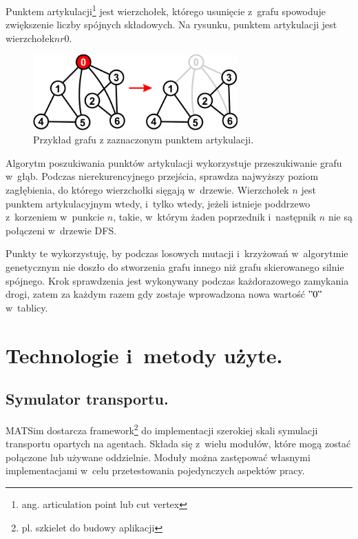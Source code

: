 \documentclass[twoside,12pt]{report}
\let\oldsection\chapter
\def\chapter{\cleardoublepage\oldsection}
\begin{document}
Punktem artykulacji\footnote{ang. articulation point lub cut vertex} jest wierzchołek, którego usunięcie z~grafu spowoduje zwiększenie liczby spójnych składowych. Na rysunku, punktem artykulacji jest wierzchołek$nr 0$.

\begin{figure}[h]
\begin{center}
\includegraphics[width=0.7\textwidth]{img/articulation}
\caption{Przykład grafu z zaznaczonym punktem artykulacji.}
\end{center}
\end{figure}

Algorytm poszukiwania punktów artykulacji wykorzystuje przeszukiwanie grafu w~głąb. Podczas nierekurencyjnego przejścia, sprawdza najwyższy poziom zagłębienia, do którego wierzchołki sięgają w~drzewie. Wierzchołek $n$ jest punktem artykulacyjnym wtedy, i~tylko wtedy, jeżeli istnieje poddrzewo z~korzeniem w~punkcie $n$, takie, w~którym żaden poprzednik i~następnik $n$ nie są połączeni w~drzewie DFS. 

Punkty te wykorzystuję, by podczas losowych mutacji i~krzyżowań w~algorytmie genetycznym nie doszło do stworzenia grafu innego niż grafu skierowanego silnie spójnego. Krok sprawdzenia jest wykonywany podczas każdorazowego zamykania drogi, zatem za każdym razem gdy zostaje wprowadzona nowa wartość $"0"$ w~tablicy.

\chapter{Technologie i~metody użyte.}\label{rozdz.technologie} 
\section{Symulator transportu.}

MATSim dostarcza framework\footnote{pl. szkielet do budowy aplikacji} do implementacji szerokiej skali symulacji transportu opartych na agentach. Składa się z~wielu modułów, które mogą zostać połączone lub używane oddzielnie. Moduły można zastępować własnymi implementacjami w~celu przetestowania pojedynczych aspektów pracy\cite{matsim}.
\end{document}
